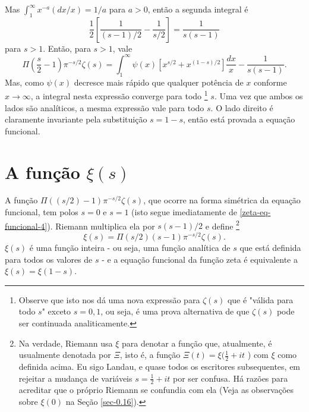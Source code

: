     Mas $\int_{1}^{\infty} x^{-a}(dx/x) = 1/a$ para $a > 0$, então a segunda integral é
    \begin{equation*}
        \frac{1}{2}\left[\frac{1}{(s-1)/2} - \frac{1}{s/2} \right] = \frac{1}{s(s-1)}
    \end{equation*}
    para $s>1$. Então, para $s>1$, vale
    \begin{equation}
        \label{zeta-eq-funcional-4}
        \Pi \left( \frac{s}{2} - 1 \right) \pi^{-s/2} \zeta(s) = \int_{1}^{\infty} \psi(x) [x^{s/2} + x^{(1 - s)/2}] \frac{dx}{x} - \frac{1}{s(s-1)}.
    \end{equation}
    Mas, como $\psi(x)$ decresce mais rápido que qualquer potência de $x$ conforme $x \to \infty$, a integral nesta expressão converge para todo
    \footnote{Observe que isto nos dá uma nova expressão para $\zeta(s)$ que é "válida para todo $s$" exceto $s = 0, 1$, ou seja, é uma prova alternativa de que $\zeta(s)$ pode ser continuada analiticamente.}
    $s$. Uma vez que ambos os lados são analíticos, a mesma expressão vale para todo $s$. O lado direito é claramente invariante pela substituição $s = 1-s$, então está provada a equação funcional.
    
    \section{A função $\xi(s)$}
    
    A função $\Pi((s/2) - 1) \pi^{-s/2} \zeta(s)$, que ocorre na forma simétrica da equação funcional, tem polos $s=0$ e $s=1$ (isto segue imediatamente de \eqref{zeta-eq-funcional-4}). Riemann multiplica ela por $s(s - 1)/2$ e define
    \footnote{Na verdade, Riemann usa $\xi$ para denotar a função que, atualmente, é usualmente denotada por $\Xi$, isto é, a função $\Xi(t) = \xi( \frac{1}{2} + it$ ) com $\xi$ como definida acima. Eu sigo Landau, e quase todos os escritores subsequentes, em rejeitar a mudança de variáveis $s = \frac{1}{2} + it$ por ser confusa. Há razões para acreditar que o próprio Riemann se confundia com ela (Veja as observações sobre $\xi(0)$ na Seção \ref{sec-0.16}).}
    \begin{equation}
        \label{xi(s)-1}
        \xi(s) = \Pi(s/2) (s - 1) \pi^{-s/2} \zeta(s).
    \end{equation}
    $\xi(s)$ é uma função inteira - ou seja, uma função analítica de $s$ que está definida para todos os valores de $s$ - e a equação funcional da função zeta é equivalente a $\xi(s) = \xi(1-s)$.
    

